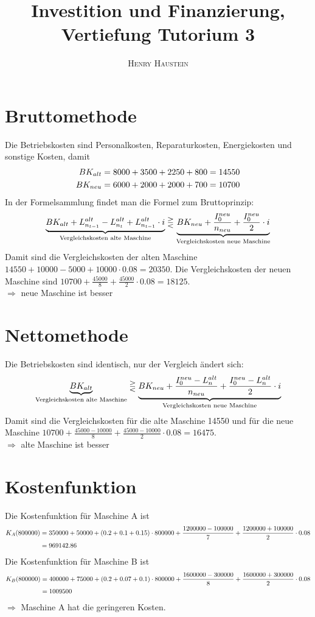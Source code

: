 \documentclass{article}
\title{\textbf{Investition und Finanzierung, Vertiefung Tutorium 3}}
\author{\textsc{Henry Haustein}}
\date{}
\begin{document}
	\maketitle
	
	\section*{Bruttomethode}
	Die Betriebskosten sind Personalkosten, Reparaturkosten, Energiekosten und sonstige Kosten, damit
	\begin{align}
		BK_{alt} &= 8000 + 3500 + 2250 + 800 = 14550 \notag \\
		BK_{neu} &= 6000 + 2000 + 2000 + 700 = 10700 \notag
	\end{align}
	In der Formelsammlung findet man die Formel zum Bruttoprinzip:
	\begin{align}
		\underbrace{BK_{alt}  + L^{alt}_{n_{t-1}} - L^{alt}_{n_t} + L^{alt}_{n_{t-1}}\cdot i}_{\text{Vergleichskosten alte Maschine}} \gtreqless \underbrace{BK_{neu} + \frac{I_0^{neu}}{n_{neu}} + \frac{I_0^{neu}}{2}\cdot i}_{\text{Vergleichskosten neue Maschine}} \notag
	\end{align}
	Damit sind die Vergleichskosten der alten Maschine $14550 + 10000 - 5000 + 10000\cdot 0.08 = 20350$. Die Vergleichskosten der neuen Maschine sind $10700 + \frac{45000}{8} + \frac{45000}{2}\cdot 0.08 = 18125$. \\
	$\Rightarrow$ neue Maschine ist besser

	\section*{Nettomethode}
	Die Betriebskosten sind identisch, nur der Vergleich ändert sich:
	\begin{align}
		\underbrace{BK_{alt}}_{\text{Vergleichskosten alte Maschine}} \gtreqless \underbrace{BK_{neu} + \frac{I_0^{neu} - L_n^{alt}}{n_{neu}} + \frac{I_0^{neu} - L_n^{alt}}{2}\cdot i}_{\text{Vergleichskosten neue Maschine}} \notag
	\end{align}
	Damit sind die Vergleichskosten für die alte Maschine 14550 und für die neue Maschine $10700 + \frac{45000-10000}{8} + \frac{45000-10000}{2}\cdot 0.08 = 16475$. \\
	$\Rightarrow$ alte Maschine ist besser

	\section*{Kostenfunktion}
	Die Kostenfunktion für Maschine A ist
	\begin{align}
		K_A(800000) &= 350000 + 50000 + (0.2 + 0.1 + 0.15)\cdot 800000 + \frac{1200000 - 100000}{7} + \frac{1200000+100000}{2}\cdot 0.08 \notag \\
		&= 969142.86 \notag
	\end{align}
	Die Kostenfunktion für Maschine B ist
	\begin{align}
		K_B(800000) &= 400000 + 75000 + (0.2 + 0.07 + 0.1)\cdot 800000 + \frac{1600000 - 300000}{8} + \frac{1600000+300000}{2}\cdot 0.08 \notag \\
		&= 1009500 \notag
	\end{align}
	$\Rightarrow$ Maschine A hat die geringeren Kosten.
	
\end{document}
